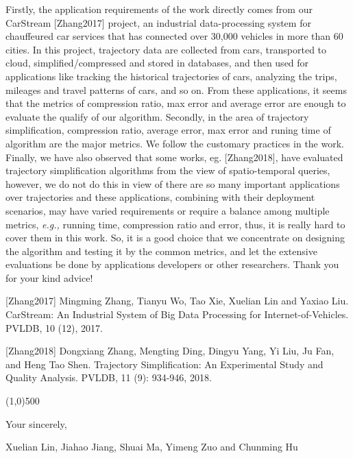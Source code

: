 \documentclass{letter}
\newcommand{\eg}{\emph{e.g.,}\xspace}
\begin{document}
Firstly, the application requirements of the work directly comes from our CarStream [Zhang2017] project, an industrial data-processing system for chauffeured car services that has connected over 30,000 vehicles in more than 60 cities. In this project, trajectory data are collected from cars, transported to cloud, simplified/compressed and stored in databases, and then used for applications like tracking the historical trajectories of cars, analyzing the trips, mileages and travel patterns of cars, and so on. From these applications, it seems that the metrics of compression ratio, max error and average error are enough to evaluate the qualify of our algorithm.
%
Secondly, in the area of trajectory simplification, compression ratio, average error, max error and runing time of algorithm are the major metrics. We follow the customary practices in the work.
%
Finally, we have also observed that some {works}, eg. [Zhang2018], have evaluated trajectory simplification algorithms from the view of spatio-temporal queries, however, we do not do this in view of there are so many important applications over trajectories and these applications, combining with their deployment scenarios, may have varied requirements or require a balance among multiple metrics, \eg running time, compression ratio and error, thus, it is really hard to cover them in this work.
%
So, it is a good choice that we concentrate on designing the algorithm and testing it by the common metrics, and let the extensive evaluations be done by applications developers or other researchers. Thank you for your kind advice!

[Zhang2017] Mingming Zhang, Tianyu Wo, Tao Xie, Xuelian Lin and Yaxiao Liu. CarStream: An Industrial System of Big Data Processing for Internet-of-Vehicles. PVLDB, 10 (12), 2017.

[Zhang2018] Dongxiang Zhang, Mengting Ding, Dingyu Yang, Yi Liu, Ju Fan, and Heng Tao Shen. Trajectory Simplification: An Experimental Study and Quality Analysis. PVLDB, 11 (9): 934-946, 2018.

\line(1,0){500}



Your sincerely,

Xuelian Lin, Jiahao Jiang, Shuai Ma, Yimeng Zuo and Chunming Hu



%
%
\end{document}
